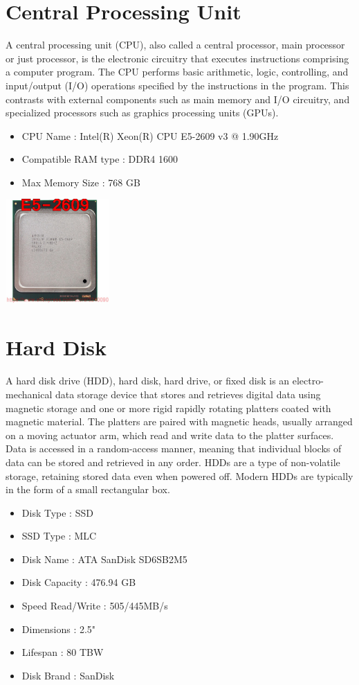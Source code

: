 \documentclass{article}
\begin{document}
\section{Central Processing Unit}
A central processing unit (CPU), also called a central processor, main processor or just processor, is the electronic circuitry that executes instructions comprising a computer program. The CPU performs basic arithmetic, logic, controlling, and input/output (I/O) operations specified by the instructions in the program. This contrasts with external components such as main memory and I/O circuitry, and specialized processors such as graphics processing units (GPUs).
\begin{itemize}
  \item CPU Name                : Intel(R) Xeon(R) CPU E5-2609 v3 @ 1.90GHz
  \item Compatible RAM type        : DDR4 1600
  \item Max Memory Size            : 768 GB
\end{itemize}
\href{http://static6.arrow.com/aropdfconversion/bc27610082f0c9042063be09408c62b0895fa247/pgurl_5465333946064300.pdf}{\includegraphics[height=4cm]{CPU.jpg}}
\section{Hard Disk}
A hard disk drive (HDD), hard disk, hard drive, or fixed disk is an electro-mechanical data storage device that stores and retrieves digital data using magnetic storage and one or more rigid rapidly rotating platters coated with magnetic material. The platters are paired with magnetic heads, usually arranged on a moving actuator arm, which read and write data to the platter surfaces. Data is accessed in a random-access manner, meaning that individual blocks of data can be stored and retrieved in any order. HDDs are a type of non-volatile storage, retaining stored data even when powered off. Modern HDDs are typically in the form of a small rectangular box.
\begin{itemize}
  \item Disk Type                : SSD 
  \item SSD Type            : MLC
  \item Disk Name                : ATA SanDisk SD6SB2M5
  \item Disk Capacity            : 476.94 GB
  \item Speed Read/Write    : 505/445MB/s
  \item Dimensions          : 2.5"
  \item Lifespan            : 80 TBW
  \item Disk Brand               : SanDisk
\end{itemize}
\end{document}
